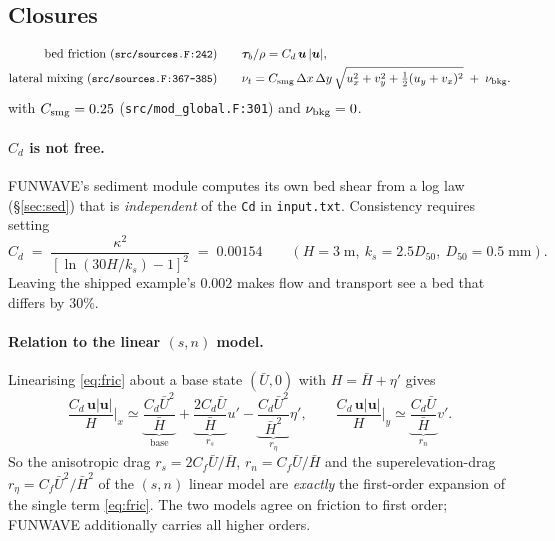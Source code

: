 \documentclass[11pt,a4paper]{article}
\newcommand{\code}[1]{\texttt{\small #1}}
\begin{document}
\subsection{Closures}
\begin{align}
  \text{bed friction (\code{src/sources.F:242})}\qquad
  &\bm\tau_b/\rho = C_d\,\bm u\,|\bm u| , \label{eq:fric}\\
  \text{lateral mixing (\code{src/sources.F:367-385})}\qquad
  &\nu_t = C_{\rm smg}\,\Delta x\,\Delta y\,
     \sqrt{u_x^2+v_y^2+\tfrac12(u_y+v_x)^2} \;+\; \nu_{\rm bkg}. \label{eq:smag}
\end{align}
with $C_{\rm smg}=0.25$ (\code{src/mod\_global.F:301}) and $\nu_{\rm bkg}=0$.

\paragraph{$C_d$ is not free.} FUNWAVE's sediment module computes its own bed shear from a
log law (\S\ref{sec:sed}) that is \emph{independent} of the \code{Cd} in \code{input.txt}.
Consistency requires setting
\begin{equation}
  C_d \;=\; \frac{\kappa^2}{\left[\ln(30H/k_s)-1\right]^2}
  \;=\; 0.00154 \qquad (H=3\;\mathrm{m},\ k_s=2.5D_{50},\ D_{50}=0.5\;\mathrm{mm}).
  \label{eq:cd}
\end{equation}
Leaving the shipped example's $0.002$ makes flow and transport see a bed that differs by
$30\%$.

\paragraph{Relation to the linear $(s,n)$ model.} Linearising \eqref{eq:fric} about a base
state $(\bar U,0)$ with $H=\bar H+\eta'$ gives
\begin{equation}
  \frac{C_d\,\bm u|\bm u|}{H}\Big|_{x} \simeq
  \underbrace{\frac{C_d\bar U^2}{\bar H}}_{\text{base}}
  + \underbrace{\frac{2C_d\bar U}{\bar H}}_{r_s}u'
  - \underbrace{\frac{C_d\bar U^2}{\bar H^2}}_{r_\eta}\eta' ,
  \qquad
  \frac{C_d\,\bm u|\bm u|}{H}\Big|_{y} \simeq
  \underbrace{\frac{C_d\bar U}{\bar H}}_{r_n}v' .
\end{equation}
So the anisotropic drag $r_s=2C_f\bar U/\bar H$, $r_n=C_f\bar U/\bar H$ and the
superelevation-drag $r_\eta=C_f\bar U^2/\bar H^2$ of the $(s,n)$ linear model are
\emph{exactly} the first-order expansion of the single term \eqref{eq:fric}. The two
models agree on friction to first order; FUNWAVE additionally carries all higher orders.
\end{document}

